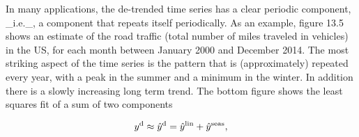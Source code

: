 In many applications, the de-trended time series has a clear periodic component, _i.e._, a component that repeats itself periodically. As an example, figure 13.5 shows an estimate of the road traffic (total number of miles traveled in vehicles) in the US, for each month between January 2000 and December 2014. The most striking aspect of the time series is the pattern that is (approximately) repeated every year, with a peak in the summer and a minimum in the winter. In addition there is a slowly increasing long term trend. The bottom figure shows the least squares fit of a sum of two components

\[y^{\rm d}\approx\hat{y}^{\rm d}=\hat{y}^{\rm lin}+\hat{y}^{\rm seas},\] 